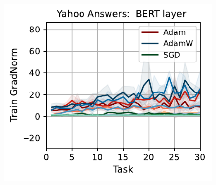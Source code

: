 \begin{figure}[htb!]
{    \includegraphics[width=\textwidth]{figs/GradNorm/nlp/bert_layer/yahoo_answers_40.pdf}
    }\\
\end{figure}
